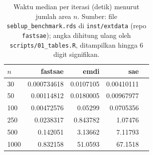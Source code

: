 \begin{table}[htbp]
\centering
\caption{Waktu median per iterasi (detik) menurut jumlah area $n$. Sumber: file \texttt{seblup\_benchmark.rds} di \texttt{inst/extdata} (repo \texttt{fastsae}); angka dihitung ulang oleh \texttt{scripts/01\_tables.R}, ditampilkan hingga 6 digit signifikan.}
\label{tab:time-sfh}
\small
\begin{tabular}{lrrrr}
\toprule
$n$ & fastsae & emdi & sae \\
\midrule
30 & 0.000734618 & 0.0107105 & 0.00410111 \\
50 & 0.00114812 & 0.0180005 & 0.00967977 \\
100 & 0.00472576 & 0.05299 & 0.0705356 \\
250 & 0.0238317 & 0.843782 & 1.07476 \\
500 & 0.142051 & 3.13662 & 7.11793 \\
1000 & 0.832158 & 51.0593 & 67.1518 \\
\bottomrule
\end{tabular}
\end{table}

